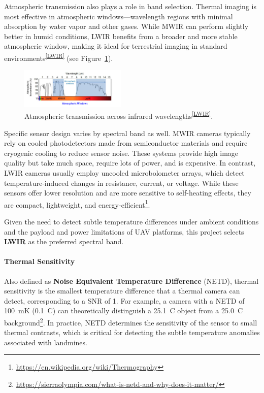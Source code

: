 Atmospheric transmission also plays a role in band selection. Thermal imaging is most effective in atmospheric windows—wavelength regions with minimal absorption by water vapor and other gases. While \gls{MWIR} can perform slightly better in humid conditions, \gls{LWIR} benefits from a broader and more stable atmospheric window, making it ideal for terrestrial imaging in standard environments\textsuperscript{\ref{LWIR}} (see Figure~\ref{fig:atmos_window}).


\begin{figure}[H]
    \centering
    \includegraphics[width=0.45\textwidth]{figs/Huirui/atmospheric_window_plot.png}
    \caption[Atmospheric transmission]{Atmospheric transmission across infrared wavelengths\textsuperscript{\ref{LWIR}}.}
    \label{fig:atmos_window}
\end{figure}


Specific sensor design varies by spectral band as well. \gls{MWIR} cameras typically rely on cooled photodetectors made from semiconductor materials and require cryogenic cooling to reduce sensor noise. These systems provide high image quality but take much space, require lots of power, and is expensive. In contrast, \gls{LWIR} cameras usually employ uncooled microbolometer arrays, which detect temperature-induced changes in resistance, current, or voltage. While these sensors offer lower resolution and are more sensitive to self-heating effects, they are compact, lightweight, and energy-efficient\footnote{\url{https://en.wikipedia.org/wiki/Thermography}}.

Given the need to detect subtle temperature differences under ambient conditions and the payload and power limitations of \gls{UAV} platforms, this project selects \textbf{\gls{LWIR}} as the preferred spectral band.


\paragraph{Thermal Sensitivity}

Also defined as \textbf{Noise Equivalent Temperature Difference} (NETD), thermal sensitivity is the smallest temperature difference that a thermal camera can detect, corresponding to a \gls{SNR} of 1. For example, a camera with a \gls{NETD} of 100~mK (0.1~\textdegree C) can theoretically distinguish a 25.1~\textdegree C object from a 25.0~\textdegree C background\footnote{\url{https://sierraolympia.com/what-is-netd-and-why-does-it-matter/}}. In practice, \gls{NETD} determines the sensitivity of the sensor to small thermal contrasts, which is critical for detecting the subtle temperature anomalies associated with landmines.

